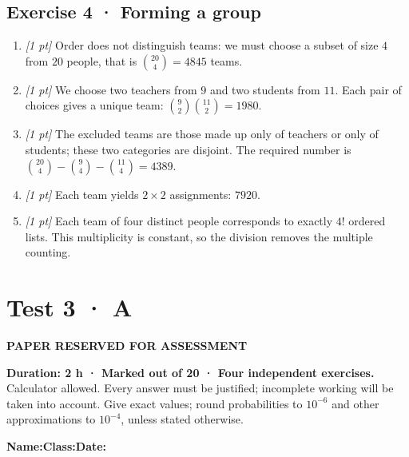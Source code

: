 \subsection*{Exercise 4 · Forming a group}\begin{enumerate}

\item \textit{[1 pt]} Order does not distinguish teams: we must choose a subset of size $4$ from $20$ people, that is $\binom{20}4=4845$ teams.

\item \textit{[1 pt]} We choose two teachers from $9$ and two students from $11$. Each pair of choices gives a unique team: $\binom{9}2\binom{11}2=1980$.

\item \textit{[1 pt]} The excluded teams are those made up only of teachers or only of students; these two categories are disjoint. The required number is $\binom{20}4-\binom{9}4-\binom{11}4=4389$.

\item \textit{[1 pt]} Each team yields $2\times2$ assignments: $7920$.

\item \textit{[1 pt]} Each team of four distinct people corresponds to exactly $4!$ ordered lists. This multiplicity is constant, so the division removes the multiple counting.

\end{enumerate}

\fi

\ifprof

\clearpage{}\label{sujet:4-3}

\section*{Test 3 · A}

{\sffamily\bfseries\color{amber}PAPER RESERVED FOR ASSESSMENT\par}

\textbf{Duration: 2 h · Marked out of 20 · Four independent exercises.}\\Calculator allowed. Every answer must be justified; incomplete working will be taken into account. Give exact values; round probabilities to $10^{-6}$ and other approximations to $10^{-4}$, unless stated otherwise.

\smallskip\textbf{Name:}\enspace\dotfill\quad\textbf{Class:}\enspace\dotfill\quad\textbf{Date:}\enspace\dotfill

